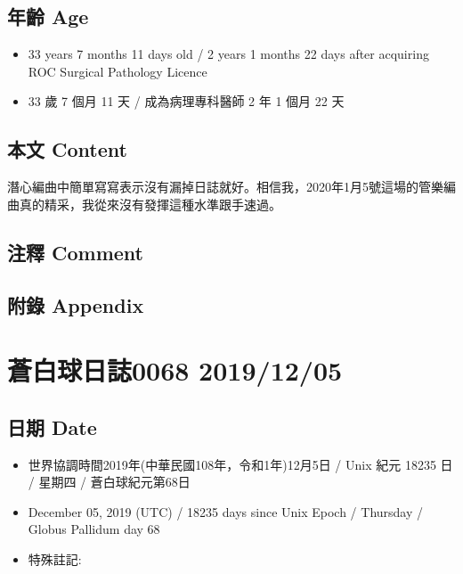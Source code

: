 \documentclass[
]{article}
\providecommand{\tightlist}{%
  \setlength{\itemsep}{0pt}\setlength{\parskip}{0pt}}
\begin{document}
\hypertarget{ux5e74ux9f61-age-3}{%
\subsection{年齡 Age}\label{ux5e74ux9f61-age-3}}

\begin{itemize}
\tightlist
\item
  33 years 7 months 11 days old / 2 years 1 months 22 days after
  acquiring ROC Surgical Pathology Licence
\item
  33 歲 7 個月 11 天 / 成為病理專科醫師 2 年 1 個月 22 天
\end{itemize}

\hypertarget{ux672cux6587-content-3}{%
\subsection{本文 Content}\label{ux672cux6587-content-3}}

潛心編曲中簡單寫寫表示沒有漏掉日誌就好。相信我，2020年1月5號這場的管樂編曲真的精采，我從來沒有發揮這種水準跟手速過。

\hypertarget{ux6ce8ux91cb-comment-3}{%
\subsection{注釋 Comment}\label{ux6ce8ux91cb-comment-3}}

\hypertarget{ux9644ux9304-appendix-3}{%
\subsection{附錄 Appendix}\label{ux9644ux9304-appendix-3}}

\hypertarget{ux84bcux767dux7403ux65e5ux8a8c0068-20191205}{%
\section{蒼白球日誌0068
2019/12/05}\label{ux84bcux767dux7403ux65e5ux8a8c0068-20191205}}

\hypertarget{ux65e5ux671f-date-4}{%
\subsection{日期 Date}\label{ux65e5ux671f-date-4}}

\begin{itemize}
\tightlist
\item
  世界協調時間2019年(中華民國108年，令和1年)12月5日 / Unix 紀元 18235 日
  / 星期四 / 蒼白球紀元第68日
\item
  December 05, 2019 (UTC) / 18235 days since Unix Epoch / Thursday /
  Globus Pallidum day 68
\item
  特殊註記:
\end{itemize}
\end{document}
